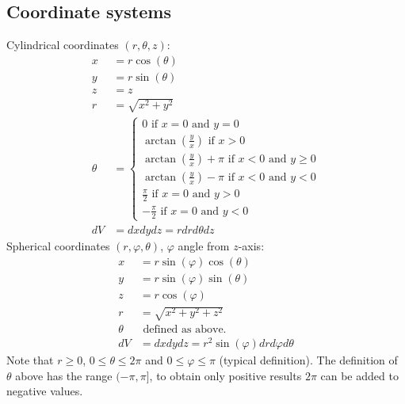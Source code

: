 \subsection{Coordinate systems}
Cylindrical coordinates $(r, \theta, z)$:
\begin{align}
    x &= r\cos(\theta)\\
    y &= r\sin(\theta)\\
    z &= z\\
    r &= \sqrt{x^2 + y^2}\\
    \theta &= 
    \begin{cases}
    0 \text{ if } x = 0 \text{ and } y = 0\\
    \arctan(\frac{y}{x}) \text{ if } x > 0\\
    \arctan(\frac{y}{x}) + \pi \text{ if } x < 0 \text{ and } y \geq 0\\
    \arctan(\frac{y}{x}) - \pi \text{ if } x < 0 \text{ and } y < 0\\
    \frac{\pi}{2} \text{ if } x = 0 \text{ and } y > 0\\
    -\frac{\pi}{2} \text{ if } x = 0 \text{ and } y < 0
    \end{cases}\\
    dV &= dxdydz = rdrd\theta dz
\end{align}
Spherical coordinates $(r, \varphi, \theta)$, $\varphi$ angle from $z$-axis:
\begin{align}
    x &= r\sin(\varphi)\cos(\theta)\\
    y &= r\sin(\varphi)\sin(\theta)\\
    z &= r\cos(\varphi)\\
    r &= \sqrt{x^2 + y^2 + z^2}\\
    \theta &\text{ defined as above.}\\
    dV &= dxdydz = r^2\sin(\varphi)dr d\varphi d\theta
\end{align}
Note that $r \geq 0$, $0 \leq \theta \leq 2\pi$ and $0 \leq \varphi \leq \pi$ (typical definition). The definition of $\theta$ above has the range $(-\pi, \pi]$, to obtain only positive results $2\pi$ can be added to negative values.


